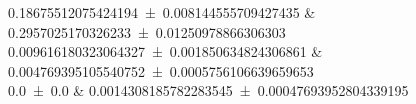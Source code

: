 \num{0.18675512075424194 \pm 0.008144555709427435}		&		\num{0.2957025170326233 \pm 0.01250978866306303}	 \\ 
\num{0.009616180323064327 \pm 0.001850634824306861}		&		\num{0.004769395105540752 \pm 0.0005756106639659653}	 \\ 
\num{0.0 \pm 0.0}		&		\num{0.0014308185782283545 \pm 0.00047693952804339195}	 \\ 
